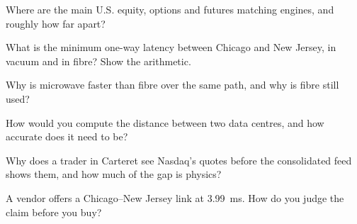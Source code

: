 \begin{interviewq}\label{iq:nw:the-north-american-map:1}
Where are the main U.S. equity, options and futures matching engines, and roughly how far apart?
\end{interviewq}

\begin{interviewq}\label{iq:nw:the-north-american-map:2}
What is the minimum one-way latency between Chicago and New Jersey, in vacuum and in fibre? Show the arithmetic.
\end{interviewq}

\begin{interviewq}\label{iq:nw:the-north-american-map:3}
Why is microwave faster than fibre over the same path, and why is fibre still used?
\end{interviewq}

\begin{interviewq}\label{iq:nw:the-north-american-map:4}
How would you compute the distance between two data centres, and how accurate does it need to be?
\end{interviewq}

\begin{interviewq}\label{iq:nw:the-north-american-map:5}
Why does a trader in Carteret see Nasdaq's quotes before the consolidated feed shows them, and how much of the gap is physics?
\end{interviewq}

\begin{interviewq}\label{iq:nw:the-north-american-map:6}
A vendor offers a Chicago--New Jersey link at \qty{3.99}{\milli\second}. How do you judge the claim before you buy?
\end{interviewq}
